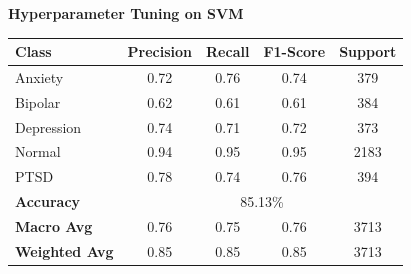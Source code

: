 \begin{center}
    \textbf{Hyperparameter Tuning on SVM} \\[0.5em]
    \begin{tabular}{|l|c|c|c|c|}
        \hline
        \textbf{Class} & \textbf{Precision} & \textbf{Recall} & \textbf{F1-Score} & \textbf{Support} \\ \hline
        Anxiety        & 0.72               & 0.76            & 0.74              & 379             \\ \hline
        Bipolar        & 0.62               & 0.61            & 0.61              & 384             \\ \hline
        Depression     & 0.74               & 0.71            & 0.72              & 373             \\ \hline
        Normal         & 0.94               & 0.95            & 0.95              & 2183            \\ \hline
        PTSD           & 0.78               & 0.74            & 0.76              & 394             \\ \hline
        \textbf{Accuracy} & \multicolumn{4}{|c|}{85.13\%} \\ \hline
        \textbf{Macro Avg} & 0.76            & 0.75            & 0.76              & 3713            \\ \hline
        \textbf{Weighted Avg} & 0.85         & 0.85            & 0.85              & 3713            \\ \hline
    \end{tabular}
\end{center}




